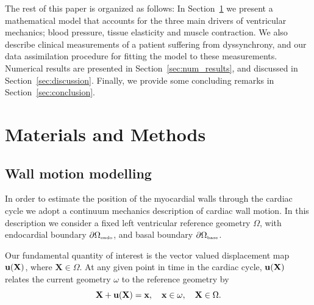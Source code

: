 The rest of this paper is organized as follows: In
Section~\ref{sec:methods} we present a mathematical model that
accounts for the three main drivers of ventricular mechanics; blood
pressure, tissue elasticity and muscle contraction.  
We also describe clinical measurements of a patient suffering from dyssynchrony, and our data assimilation procedure
for fitting the model to these measurements.
Numerical results are presented in Section~\ref{sec:num_results}, and discussed in
Section~\ref{sec:discussion}. Finally, we provide some concluding
remarks in Section~\ref{sec:conclusion}.


\section{Materials and Methods}
\label{sec:methods}

\subsection{Wall motion modelling}

\label{sec:wall_motion}
In order to estimate the position of the myocardial walls through
the cardiac cycle we adopt a continuum mechanics description of
cardiac wall motion. In this description we consider a fixed left
ventricular reference geometry $\Omega$, with endocardial boundary
$\partial \Omega_{ \textnormal{\tiny \text{endo}}}$, and basal boundary $\partial \Omega_{\textnormal{\tiny\text{base}}}$.

Our fundamental quantity of interest is the vector valued displacement
map $\mathbf{u}(\mathbf{X})$, where $\mathbf{X} \in \Omega$.  At any given
point in time in the cardiac cycle, $\mathbf{u}(\mathbf{X})$ relates
the current geometry $\omega$ to the reference geometry by
 \begin{equation}
{\bf X} + {\bf u}({\bf X}) = {\bf x}, \quad {\bf x} \in \omega, \quad {\bf X} \in \Omega. 
\end{equation}

